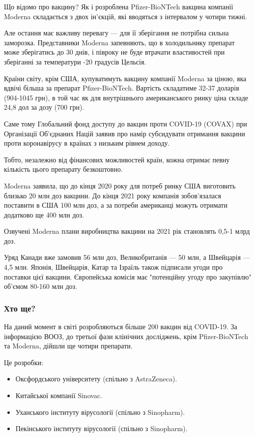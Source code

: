     Що відомо про вакцину? Як і розроблена Pfizer-BioNTech вакцина компанії Moderna складається з двох ін’єкцій, які вводяться з інтервалом у чотири тижні.

    Але остання має важливу перевагу --- для її зберігання не потрібна сильна заморозка. Представники Moderna запевняють, що в холодильнику препарат може зберігатись до 30 днів, і півроку не буде втрачати властивостей при зберіганні за температури -20 градусів Цельсія.

    Країни світу, крім США, купуватимуть вакцину компанії Moderna за ціною, яка вдвічі більша за препарат Pfizer-BioNTech. Вартість складатиме 32-37 доларів (904-1045 грн), в той час як для внутрішнього американського ринку ціна складе 24,8 дол за дозу (700 грн).

Саме тому Глобальний фонд доступу до вакцин проти COVID-19 (COVAX) при Організації Об'єднаних Націй заявив про намір субсидувати отримання вакцини проти коронавірусу в країнах з низьким рівнем доходу.

Тобто, незалежно від фінансових можливостей країн, кожна отримає певну кількість цього препарату безкоштовно.

Moderna заявила, що до кінця 2020 року для потреб ринку США виготовить близько 20 млн доз вакцини. До кінця 2021 року компанія зобов’язалася поставити в США 100 млн доз, а за потреби американці можуть отримати додатково ще 400 млн доз.

    Озвучені Moderna плани виробництва вакцини на 2021 рік становлять 0,5-1 млрд доз.

Уряд Канади вже замовив 56 млн доз, Великобританія --- 50 млн, а Швейцарія --- 4,5
млн. Японія, Швейцарія, Катар та Ізраїль також підписали угоди про поставки
цієї вакцини. Європейська комісія має "потенційну угоду про закупівлю" об’ємом
80-160 млн доз.

\subsubsection{Хто ще?}

На даний момент в світі розробляються більше 200 вакцин від COVID-19. За
інформацією ВООЗ, до третьої фази клінічних досліджень, крім Pfizer-BioNTech та
Moderna, дійшли ще чотири препарати.

Це розробки:

\begin{itemize}
  \item Оксфордського університету (спільно з AstraZeneca).
  \item Китайської компанії Sinovac.
  \item Уханського інституту вірусології (спільно з Sinopharm).
  \item Пекінського інституту вірусології (спільно з Sinopharm).
\end{itemize}

